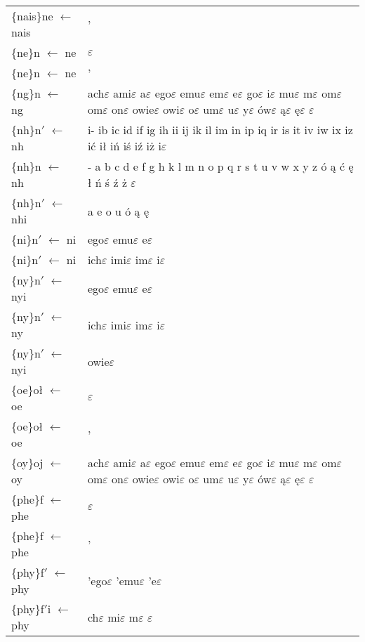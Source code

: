 \documentclass{article}
\begin{document}
\begin{longtable}{l|p{10cm}}
\{nais\}ne $\leftarrow$ nais & ’\\
\{ne\}n $\leftarrow$ ne & $\varepsilon$\\
\{ne\}n $\leftarrow$ ne & ’\\
\{ng\}n $\leftarrow$ ng & ach$\varepsilon$ ami$\varepsilon$ a$\varepsilon$ ego$\varepsilon$ emu$\varepsilon$ em$\varepsilon$ e$\varepsilon$ go$\varepsilon$ i$\varepsilon$ mu$\varepsilon$ m$\varepsilon$ om$\varepsilon$ om$\varepsilon$ on$\varepsilon$ owie$\varepsilon$ owi$\varepsilon$ o$\varepsilon$ um$\varepsilon$ u$\varepsilon$ y$\varepsilon$ ów$\varepsilon$ ą$\varepsilon$ ę$\varepsilon$ $\varepsilon$\\
\{nh\}n$'$ $\leftarrow$ nh & i- ib ic id if ig ih ii ij ik il im in ip iq ir is it iv iw ix iz ić ił iń iś iź iż i$\varepsilon$\\
\{nh\}n $\leftarrow$ nh & - a b c d e f g h k l m n o p q r s t u v w x y z ó ą ć ę ł ń ś ź ż $\varepsilon$\\
\{nh\}n$'$ $\leftarrow$ nhi & a e o u ó ą ę\\
\{ni\}n$'$ $\leftarrow$ ni & ego$\varepsilon$ emu$\varepsilon$ e$\varepsilon$\\
\{ni\}n$'$ $\leftarrow$ ni & ich$\varepsilon$ imi$\varepsilon$ im$\varepsilon$ i$\varepsilon$\\
\{ny\}n$'$ $\leftarrow$ nyi & ego$\varepsilon$ emu$\varepsilon$ e$\varepsilon$\\
\{ny\}n$'$ $\leftarrow$ ny & ich$\varepsilon$ imi$\varepsilon$ im$\varepsilon$ i$\varepsilon$\\
\{ny\}n$'$ $\leftarrow$ nyi & owie$\varepsilon$\\
\{oe\}oł $\leftarrow$ oe & $\varepsilon$\\
\{oe\}oł $\leftarrow$ oe & ’\\
\{oy\}oj $\leftarrow$ oy & ach$\varepsilon$ ami$\varepsilon$ a$\varepsilon$ ego$\varepsilon$ emu$\varepsilon$ em$\varepsilon$ e$\varepsilon$ go$\varepsilon$ i$\varepsilon$ mu$\varepsilon$ m$\varepsilon$ om$\varepsilon$ om$\varepsilon$ on$\varepsilon$ owie$\varepsilon$ owi$\varepsilon$ o$\varepsilon$ um$\varepsilon$ u$\varepsilon$ y$\varepsilon$ ów$\varepsilon$ ą$\varepsilon$ ę$\varepsilon$ $\varepsilon$\\
\{phe\}f $\leftarrow$ phe & $\varepsilon$\\
\{phe\}f $\leftarrow$ phe & ’\\
\{phy\}f$'$ $\leftarrow$ phy & ’ego$\varepsilon$ ’emu$\varepsilon$ ’e$\varepsilon$\\
\{phy\}f$'$i $\leftarrow$ phy & ch$\varepsilon$ mi$\varepsilon$ m$\varepsilon$ $\varepsilon$\\

\end{longtable}
\end{document}
